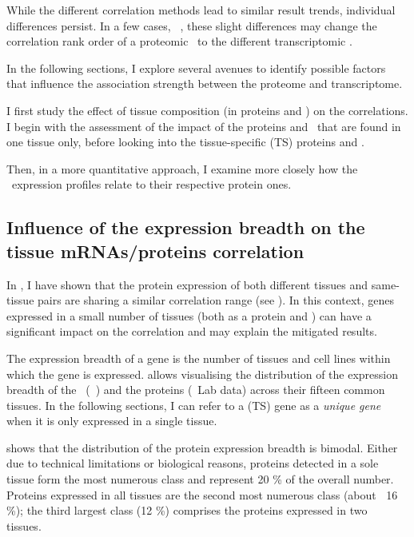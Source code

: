 While the different correlation methods lead to similar result trends,
individual differences persist.
In a few cases, \eg\ \heart,
these slight differences may change the correlation rank order of
a proteomic \treps\ to the different transcriptomic \treps{}.\mybr\

In the following sections,
I explore several avenues to identify possible factors
that influence the association strength
between the proteome and transcriptome.\mybr\

I first study the effect of tissue composition (in proteins and \mRNAs)
on the correlations.
I begin with the assessment of the impact of the proteins and \mRNAs\
that are found in one tissue only,
before looking into the tissue-specific (\gls{TS}) proteins and \mRNAs{}.\mybr\

Then, in a more quantitative approach,
I examine more closely how the \mRNA\ expression profiles relate
to their respective protein ones.\mybr\

\subsection{Influence of the expression breadth on the tissue %
\texorpdfstring{\MakeLowercase{m}RNAs/proteins}{mRNAs/proteins} correlation}

In ,
I have shown that
the protein expression of both different tissues and same-tissue pairs
are sharing a similar correlation range
(see ).
In this context,
genes expressed in a small number of tissues
(both as a protein and \mRNA)
can have a significant impact on the correlation
and may explain the mitigated results.\mybr\

The expression breadth of a gene is
the number of tissues and cell lines within which the gene is expressed.
\Cref{fig:expressionBreadth} allows visualising
the distribution of the expression breadth of the \mRNAs\ (\uhlen\ \etal)
and the proteins (\pandey\ Lab data) across their fifteen common tissues.
In the following sections,
I can refer to a (\gls{TS}) gene as a \emph{unique gene}
when it is only expressed in a single tissue.\mybr\

 shows that
the distribution of the protein expression breadth is bimodal.
Either due to technical limitations or biological reasons,
proteins detected in a sole tissue form
the most numerous class and represent 20 \% of the overall number.
Proteins expressed in all tissues are the second most numerous class (about $~$ 16 \%);
the third largest class (12 \%) comprises the proteins expressed in two tissues.\mybr\

